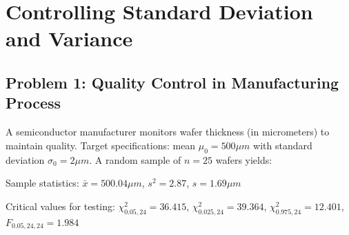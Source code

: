 \documentclass[12pt]{article}
\begin{document}
\section{Controlling Standard Deviation and Variance}

\subsection*{Problem 1: Quality Control in Manufacturing Process}

A semiconductor manufacturer monitors wafer thickness (in micrometers) to maintain quality. Target specifications: mean $\mu_0 = 500\mu m$ with standard deviation $\sigma_0 = 2\mu m$. A random sample of $n=25$ wafers yields:

Sample statistics: $\bar{x} = 500.04\mu m$, $s^2 = 2.87$, $s = 1.69\mu m$

Critical values for testing: $\chi^2_{0.05,24} = 36.415$, $\chi^2_{0.025,24} = 39.364$, $\chi^2_{0.975,24} = 12.401$, $F_{0.05,24,24} = 1.984$
\end{document}
